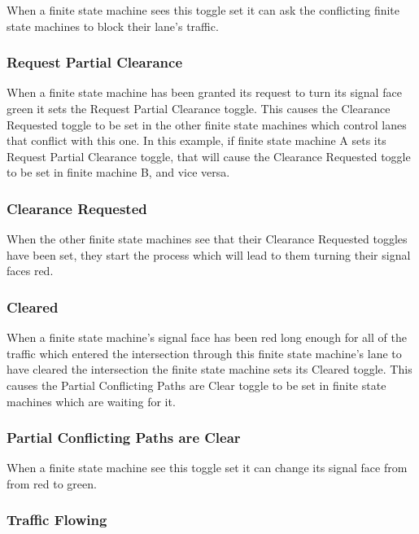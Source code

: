 \documentclass[letterpaper,twoside]{article}
\begin{document}
When a finite state machine sees this toggle set it can ask the conflicting
finite state machines to block their lane's traffic.

\subsubsection{Request Partial Clearance}

When a finite state machine has been granted its request to turn
its signal face green it sets
the Request Partial Clearance toggle.  This causes the Clearance Requested
toggle to be set in the other finite state machines which control lanes
that conflict with this one.  In this example, if finite state machine
A sets its Request Partial Clearance toggle, that will cause the
Clearance Requested toggle to be set in finite machine B, and vice versa.

\subsubsection{Clearance Requested}

When the other finite state machines see that their Clearance Requested
toggles have been set, they start the process which will lead to
them turning their signal faces red.

\subsubsection{Cleared}

When a finite state machine's signal face has been red long enough for all
of the traffic which entered the intersection through this finite state
machine's lane to have cleared the intersection the finite state machine
sets its Cleared toggle.
This causes the Partial Conflicting Paths are Clear toggle to be set
in finite state machines which are waiting for it.

\subsubsection{Partial Conflicting Paths are Clear}

When a finite state machine see this toggle set it can change its signal
face from from red to green.

\subsubsection{Traffic Flowing}
\end{document}
